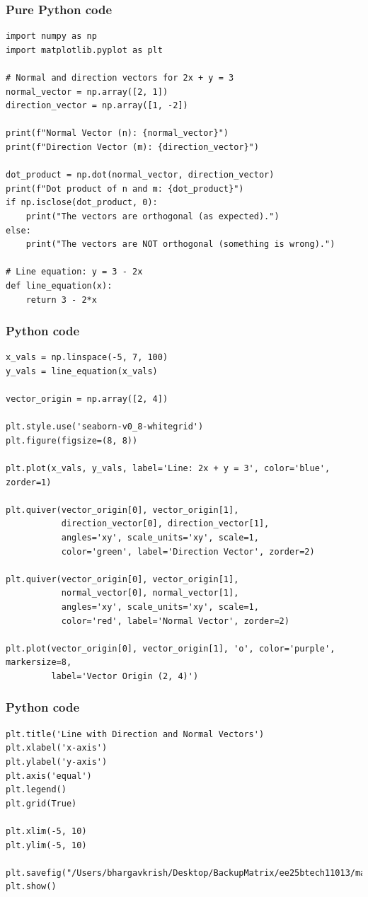 \documentclass{beamer}
\begin{document}
\begin{frame}[fragile]
    \frametitle{ Pure Python code}

    \begin{lstlisting}
import numpy as np
import matplotlib.pyplot as plt

# Normal and direction vectors for 2x + y = 3
normal_vector = np.array([2, 1])
direction_vector = np.array([1, -2])

print(f"Normal Vector (n): {normal_vector}")
print(f"Direction Vector (m): {direction_vector}")

dot_product = np.dot(normal_vector, direction_vector)
print(f"Dot product of n and m: {dot_product}")
if np.isclose(dot_product, 0):
    print("The vectors are orthogonal (as expected).")
else:
    print("The vectors are NOT orthogonal (something is wrong).")

# Line equation: y = 3 - 2x
def line_equation(x):
    return 3 - 2*x
    \end{lstlisting}
\end{frame}

\begin{frame}[fragile]
    \frametitle{Python code}

    \begin{lstlisting}
x_vals = np.linspace(-5, 7, 100)
y_vals = line_equation(x_vals)

vector_origin = np.array([2, 4])

plt.style.use('seaborn-v0_8-whitegrid')
plt.figure(figsize=(8, 8))

plt.plot(x_vals, y_vals, label='Line: 2x + y = 3', color='blue', zorder=1)

plt.quiver(vector_origin[0], vector_origin[1],
           direction_vector[0], direction_vector[1],
           angles='xy', scale_units='xy', scale=1,
           color='green', label='Direction Vector', zorder=2)

plt.quiver(vector_origin[0], vector_origin[1],
           normal_vector[0], normal_vector[1],
           angles='xy', scale_units='xy', scale=1,
           color='red', label='Normal Vector', zorder=2)

plt.plot(vector_origin[0], vector_origin[1], 'o', color='purple', markersize=8,
         label='Vector Origin (2, 4)')

\end{lstlisting}
\end{frame}

\begin{frame}[fragile]
    \frametitle{Python code}

    \begin{lstlisting}
plt.title('Line with Direction and Normal Vectors')
plt.xlabel('x-axis')
plt.ylabel('y-axis')
plt.axis('equal')
plt.legend()
plt.grid(True)

plt.xlim(-5, 10)
plt.ylim(-5, 10)

plt.savefig("/Users/bhargavkrish/Desktop/BackupMatrix/ee25btech11013/matgeo/4.2.16/figs/Figure_2.png")
plt.show()

    \end{lstlisting}
\end{frame}
\end{document}
